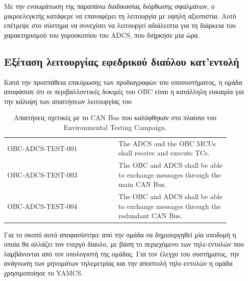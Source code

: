 \documentclass[a4paper,nobib,justified]{tufte-book}
\begin{document}
Με την ενσωμάτωση της παραπάνω διαδικασίας διόρθωσης σφαλμάτων, ο μικροελεγκτής κατάφερε να επαναφέρει τη λειτουργία με υψηλή αξιοπιστία. Αυτό επέτρεψε στο σύστημα να συνεχίσει να λειτουργεί αδιάλειπτα για τη διάρκεια του χαρακτηρισμού του γυροσκοπίου του ADCS, που διήρκησε μία ώρα.

\clearpage
\subsection{Εξέταση λειτουργίας εφεδρικού διαύλου κατ'εντολή}
\label{chap:switch-tc}
Κατά την προσπάθεια επικύρωσης των προδιαγραφών του υποσυστήματος, η ομάδα αποφάσισε ότι οι περιβαλλοντικές δοκιμές του OBC είναι η κατάλληλη ευκαιρία για την κάλυψη των απαιτήσεων λειτουργίας του 

\begin{table}
    \centering
    \caption[Απαιτήσεις σχετικές με το CAN Bus]{Απαιτήσεις σχετικές με το CAN Bus που καλύφθηκαν στο πλαίσιο του Environmental Testing Campaign.}
    \label{tab:campaign-requirements}
    \begin{tabular}{|p{0.45\linewidth}|p{0.45\linewidth}|}
        \hline
        \rowcolor[HTML]{4F5054}
        \multicolumn{2}{|c|}{\color[HTML]{FFFFFF} Requirements} \\ \hline
        \rowcolor[HTML]{F0F0F1} OBC-ADCS-TEST-001 & The ADCS and the OBC MCUs shall receive and execute TCs. \\ \hline
        \rowcolor[HTML]{F0F0F1} OBC-ADCS-TEST-003 & The OBC and ADCS shall be able to exchange messages through the main CAN Bus. \\ \hline
        \rowcolor[HTML]{F0F0F1} OBC-ADCS-TEST-004 & The OBC and ADCS shall be able to exchange messages through the redundant CAN Bus. \\ \hline
    \end{tabular}
\end{table}

Για το σκοπό αυτό αποφασίστηκε από την ομάδα να δημιουργηθεί μία υποδομή η οποία θα αλλάζει τον ενεργό δίαυλο, με βάση το περιεχόμενο των τηλε-εντολών που λαμβάνονται από τον υπολογιστή της ομάδας. Για τον έλεγχο του συστήματος, την ανάγνωση των μηνυμάτων τηλεμετρίας και την αποστολή τηλε-εντολών η ομάδα χρησιμοποίησε το YAMCS.

\end{document}
